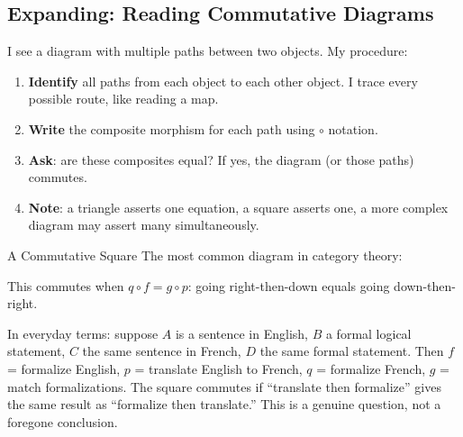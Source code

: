 \subsection{Expanding: Reading Commutative Diagrams}

\begin{dialog}
I see a diagram with multiple paths between two objects. My procedure:
\begin{enumerate}
  \item \textbf{Identify} all paths from each object to each other object.
        I trace every possible route, like reading a map.
  \item \textbf{Write} the composite morphism for each path using $\circ$
        notation.
  \item \textbf{Ask}: are these composites equal? If yes, the diagram (or
        those paths) commutes.
  \item \textbf{Note}: a triangle asserts one equation, a square asserts one,
        a more complex diagram may assert many simultaneously.
\end{enumerate}
\end{dialog}

\begin{example}{A Commutative Square}
The most common diagram in category theory:

\medskip
\begin{center}
\end{center}
\medskip

This commutes when $q \circ f = g \circ p$: going right-then-down equals
going down-then-right.

\medskip

In everyday terms: suppose $A$ is a sentence in English, $B$ a formal logical
statement, $C$ the same sentence in French, $D$ the same formal statement.
Then $f$ = formalize English, $p$ = translate English to French, $q$ =
formalize French, $g$ = match formalizations. The square commutes if
``translate then formalize'' gives the same result as ``formalize then
translate.'' This is a genuine question, not a foregone conclusion.
\end{example}


